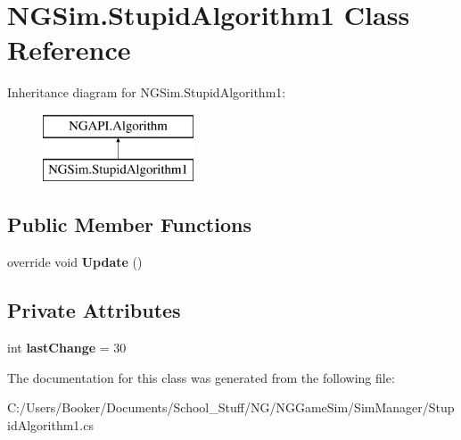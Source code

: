 \hypertarget{class_n_g_sim_1_1_stupid_algorithm1}{}\section{N\+G\+Sim.\+Stupid\+Algorithm1 Class Reference}
\label{class_n_g_sim_1_1_stupid_algorithm1}
Inheritance diagram for N\+G\+Sim.\+Stupid\+Algorithm1\+:\begin{figure}[H]
\begin{center}
\leavevmode
\includegraphics[height=2.000000cm]{class_n_g_sim_1_1_stupid_algorithm1}
\end{center}
\end{figure}
\subsection*{Public Member Functions}
\begin{DoxyCompactItemize}
\item 
\mbox{\label{class_n_g_sim_1_1_stupid_algorithm1_a27fbaa43c88152734ac02a0c773777de}} 
override void {\bfseries Update} ()
\end{DoxyCompactItemize}
\subsection*{Private Attributes}
\begin{DoxyCompactItemize}
\item 
\mbox{\label{class_n_g_sim_1_1_stupid_algorithm1_a520c52e8dffa39a1943da0200540f3c9}} 
int {\bfseries last\+Change} = 30
\end{DoxyCompactItemize}


The documentation for this class was generated from the following file\+:\begin{DoxyCompactItemize}
\item 
C\+:/\+Users/\+Booker/\+Documents/\+School\+\_\+\+Stuff/\+N\+G/\+N\+G\+Game\+Sim/\+Sim\+Manager/Stupid\+Algorithm1.\+cs\end{DoxyCompactItemize}
